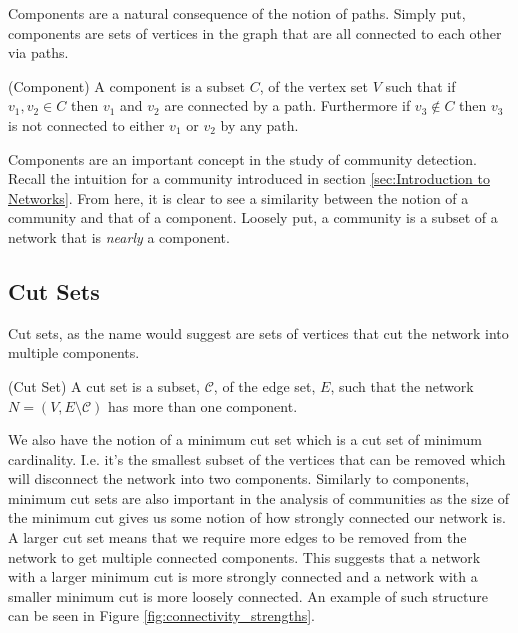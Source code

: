 Components are a natural consequence of the notion of paths. Simply put, components are sets of vertices in the graph that are all connected to each other via paths.

\begin{definition}{(Component)}
    A component is a subset $C$, of the vertex set $V$ such that if $v_1, v_2 \in C$ then $v_1$ and $v_2$ are connected by a path. Furthermore if $v_3 \not\in C$ then $v_3$ is not connected to either $v_1$ or $v_2$ by any path.
\end{definition}

Components are an important concept in the study of community detection. Recall the intuition for a community introduced in section \ref{sec:Introduction to Networks}. From here, it is clear to see a similarity between the notion of a community and that of a component. Loosely put, a community is a subset of a network that is \emph{nearly} a component.

\subsection{Cut Sets}
Cut sets, as the name would suggest are sets of vertices that cut the network into multiple components. 

\begin{definition}{(Cut Set)}
    A cut set is a subset, $\mathcal{C}$, of the edge set, $E$, such that the network $N = (V, E\setminus\mathcal{C})$ has more than one component.
\end{definition}

We also have the notion of a minimum cut set which is a cut set of minimum cardinality. I.e. it's the smallest subset of the vertices that can be removed which will disconnect the network into two components. Similarly to components, minimum cut sets are also important in the analysis of communities as the size of the minimum cut gives us some notion of how strongly connected our network is. A larger cut set means that we require more edges to be removed from the network to get multiple connected components. This suggests that a network with a larger minimum cut is more strongly connected and a network with a smaller minimum cut is more loosely connected. An example of such structure can be seen in Figure \ref{fig:connectivity_strengths}.

